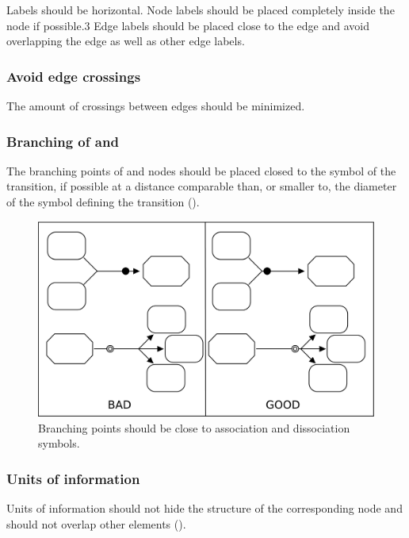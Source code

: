 Labels should be horizontal. Node labels should be placed completely
inside the node if possible.3 Edge labels should be placed close to
the edge and avoid overlapping the edge as well as other edge
labels.

\subsubsection{Avoid edge crossings}

The amount of crossings between edges should be minimized.

\subsubsection{Branching of  and }

The branching points of  and  nodes 
should be placed closed to the symbol of the transition, if possible 
at a distance comparable than, or smaller to, the diameter of the 
symbol defining the transition ().

\begin{figure}[h!]
  \centering
  \includegraphics[scale=0.3]{images/layout-branching}
  \caption{Branching points should be close to association and 
  dissociation symbols.}\label{fig:af:branching}
\end{figure}

\subsubsection{Units of information}

Units of information should not hide the structure of the
corresponding node and should not overlap other
elements ().

